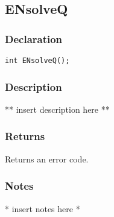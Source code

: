 \subsection{ENsolveQ}
\subsubsection{Declaration}
\begin{lstlisting}
int ENsolveQ();
\end{lstlisting}
\subsubsection{Description}
** insert description here **
\subsubsection{Returns}
Returns an error code.
\subsubsection{Notes}
* insert notes here *